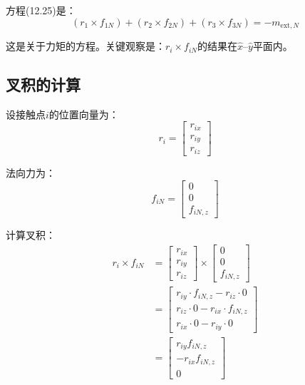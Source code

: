 \documentclass[12pt,a4paper]{article}
\begin{document}
方程(12.25)是：
\begin{equation}
(r_1 \times f_{1N}) + (r_2 \times f_{2N}) + (r_3 \times f_{3N}) = -m_{\text{ext},N} \label{eq:12.25}
\end{equation}

这是关于力矩的方程。关键观察是：$r_i \times f_{iN}$的结果在$\hat{x}$--$\hat{y}$平面内。

\subsection{叉积的计算}

设接触点$i$的位置向量为：
\begin{equation}
r_i = \begin{bmatrix} r_{ix} \\ r_{iy} \\ r_{iz} \end{bmatrix}
\end{equation}

法向力为：
\begin{equation}
f_{iN} = \begin{bmatrix} 0 \\ 0 \\ f_{iN,z} \end{bmatrix}
\end{equation}

计算叉积：
\begin{align}
r_i \times f_{iN} &= \begin{bmatrix} r_{ix} \\ r_{iy} \\ r_{iz} \end{bmatrix} \times \begin{bmatrix} 0 \\ 0 \\ f_{iN,z} \end{bmatrix} \\
&= \begin{bmatrix} r_{iy} \cdot f_{iN,z} - r_{iz} \cdot 0 \\ r_{iz} \cdot 0 - r_{ix} \cdot f_{iN,z} \\ r_{ix} \cdot 0 - r_{iy} \cdot 0 \end{bmatrix} \\
&= \begin{bmatrix} r_{iy} f_{iN,z} \\ -r_{ix} f_{iN,z} \\ 0 \end{bmatrix}
\end{align}
\end{document}
